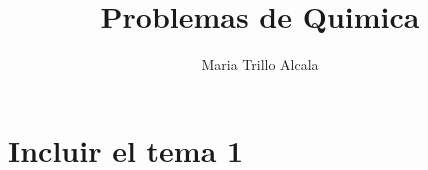 \documentclass[11pt,twoside,a4paper]{article}
\title{Problemas de Quimica}
\author{Maria Trillo Alcala}
\theoremstyle{problem}
\begin{document}
\section{Incluir el tema 1}



\end{document}
